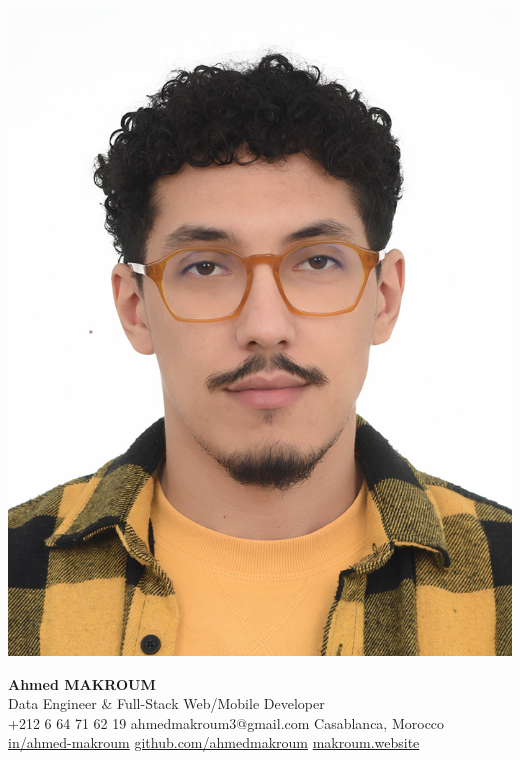 \documentclass[10pt,a4paper,sans]{moderncv}
\begin{document}
\hspace*{0.03\textwidth}%
\begin{minipage}[c]{0.13\textwidth}
  \includegraphics[width=0.85\linewidth]{images/ahmed.jpg}
\end{minipage}%
\hfill
\begin{minipage}[c]{0.84\textwidth}
  \begin{center}
    {\fontsize{20}{22}\selectfont\textbf{Ahmed MAKROUM}}\\[0.7em]
    {\fontsize{13.2}{15.4}\selectfont Data Engineer \& Full-Stack Web/Mobile Developer} \\[0.5em]
    {\fontsize{10.5}{12.3}\selectfont
      \faMobile\enspace +212 6 64 71 62 19 \quad
      \faEnvelope\enspace ahmedmakroum3@gmail.com \quad
      \faHome\enspace Casablanca, Morocco \\
      \faLinkedin\enspace \href{https://www.linkedin.com/in/ahmed-makroum/}{in/ahmed-makroum} \quad
      \faGithub\enspace \href{https://github.com/ahmedmakroum}{github.com/ahmedmakroum}\quad
      \faGlobe\enspace \href{https://makroum.website}{makroum.website}
    }\\[1em]
  \end{center}
\end{minipage}
\vspace{-17pt}
\end{document}
